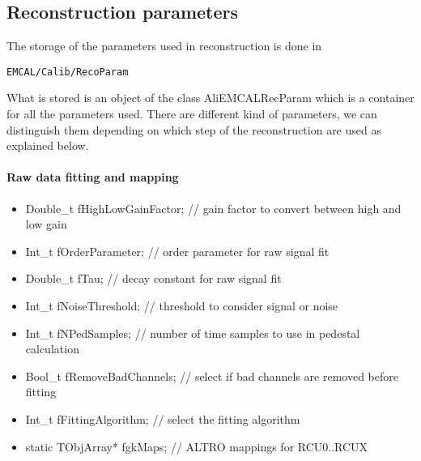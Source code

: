\subsection{Reconstruction parameters}

The storage of the parameters used in reconstruction is done in 
\begin{lstlisting}
EMCAL/Calib/RecoParam
\end{lstlisting}
What is stored is an object of the class AliEMCALRecParam which is a container for all the parameters used. There are different kind of parameters, we can distinguish them depending on which step of the reconstruction are used as explained below.

\paragraph*{Raw data fitting and mapping}
\begin{itemize}

  \item Double\_t fHighLowGainFactor;  // gain factor to convert between high and low gain

   \item  Int\_t    fOrderParameter;        // order parameter for raw signal fit

  \item   Double\_t fTau;                       // decay constant for raw signal fit

  \item   Int\_t    fNoiseThreshold;          // threshold to consider signal or noise

   \item  Int\_t    fNPedSamples;            // number of time samples to use in pedestal calculation

   \item  Bool\_t   fRemoveBadChannels; // select if bad channels are removed before fitting

  \item   Int\_t    fFittingAlgorithm;         // select the fitting algorithm

   \item  static TObjArray* fgkMaps;      // ALTRO mappings for RCU0..RCUX
\end{itemize}

